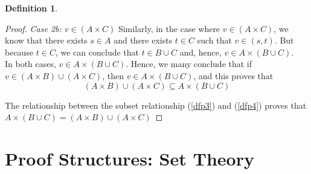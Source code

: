 \documentclass{book}
\theoremstyle{definition}
\newtheorem{definition}{Definition}[section]
\theoremstyle{remark}
\begin{document}
\begin{definition}
\begin{proof}
                    \textit{Case 2b: $v \in (A \times C)$}    
                        Similarly, in the case where $v \in (A \times C)$, we know that there exists $s \in A$ and there exists $t \in C$ such that $v \in (s,t)$. But because $t \in C$, we can conclude that $t \in B \cup C$ and, hence, $v \in A \times (B \cup C)$. \\
                
                In both cases, $v \in A \times (B \cup C)$. Hence, we many conclude that if $v \in (A \times B) \cup (A \times C)$, then $v \in A \times (B \cup C)$, and this proves that 
                    \begin{equation}
                    \label{dfp4}
                        (A \times B) \cup (A \times C) \subseteq A \times (B \cup C)
                    \end{equation}
            
            The relationship between the subset relationship (\ref{dfp3}) and (\ref{dfp4}) proves that $A \times (B \cup C) = (A \times B) \cup (A \times C)$ 
        \end{proof}

\end{definition}



\newpage
\section{Proof Structures: Set Theory}
\end{document}
